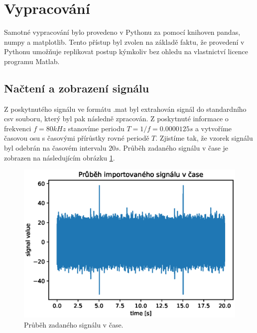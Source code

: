 \documentclass{article}
\begin{document}
	
	
	
	\section{Vypracování}
		Samotné vypracování bylo provedeno v Pythonu za pomocí knihoven pandas, numpy a matplotlib. Tento přístup byl zvolen na základě faktu, že provedení v Pythonu umožňuje replikovat postup kýmkoliv bez ohledu na vlastnictví licence programu Matlab.
		\subsection{Načtení a zobrazení signálu}
			Z poskytnutého signálu ve formátu .mat byl extrahován signál do standardního csv souboru, který byl pak následně zpracován. Z poskytnuté informace o frekvenci \(f = 80kHz\) stanovíme periodu \(T = 1/f = 0.0000125 s\) a vytvoříme časovou osu s časovými přírůstky rovné periodě \(T\). Zjistíme tak, že vzorek signálu byl odebrán na časovém intervalu \(20s\). Průběh zadaného signálu v čase je zobrazen na následujícím obrázku \ref{graph:prubeh_signalu}. 
				\begin{figure}[H]
					\centering
					\includegraphics[width=\textwidth]{./Graphics/signal_v_case}
					\caption{Průběh zadaného signálu v čase.}
					\label{graph:prubeh_signalu}
				\end{figure}
			
\end{document}
